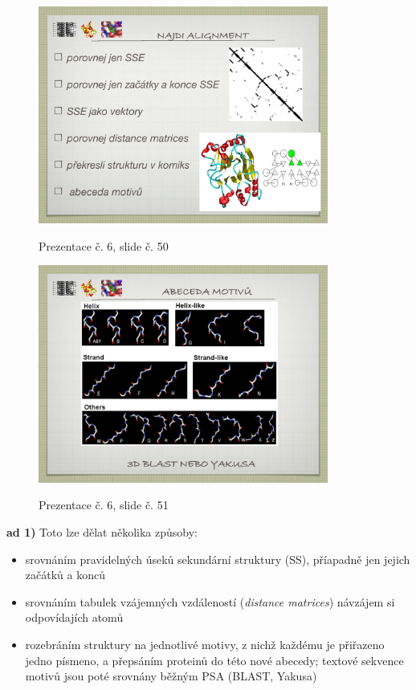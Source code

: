 \documentclass[DIV=8]{scrreprt}
\begin{document}
\begin{figure}
    \caption{Prezentace č. 6, slide č. 50}
    \includegraphics[width=0.85\textwidth]{slides-6/slide-50.jpg}
    \centering
    \label{slides-6-slide-50}
\end{figure}
\begin{figure}
    \caption{Prezentace č. 6, slide č. 51}
    \includegraphics[width=0.85\textwidth]{slides-6/slide-51.jpg}
    \centering
    \label{slides-6-slide-51}
\end{figure}

\textbf{ad 1)} Toto lze dělat několika způsoby:
\begin{itemize}[nosep]
    \item srovnáním pravidelných úseků sekundární struktury (SS), příapadně jen jejich začátků a konců
    \item srovnáním tabulek vzájemných vzdáleností (\emph{distance matrices}) návzájem si odpovídajích atomů
    \item rozebráním struktury na jednotlivé motivy, z nichž každému je přiřazeno jedno písmeno, a přepsáním proteinů do této nové abecedy; textové sekvence motivů jsou poté srovnány běžným PSA (BLAST, Yakusa)
\end{itemize}
\end{document}
